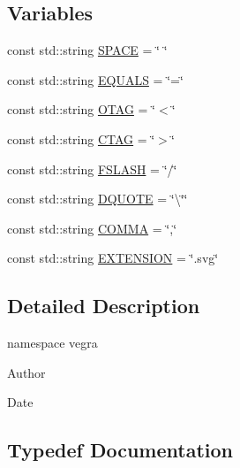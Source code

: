 \subsection*{Variables}
\begin{DoxyCompactItemize}
\item 
const std\+::string \mbox{\hyperlink{namespacevegra_a490ca2f98836fa22a92f9e141cc7ab1e}{S\+P\+A\+CE}} = \char`\"{} \char`\"{}
\item 
const std\+::string \mbox{\hyperlink{namespacevegra_adc1a2a72f90b97032bad20408a31dfb5}{E\+Q\+U\+A\+LS}} = \char`\"{}=\char`\"{}
\item 
const std\+::string \mbox{\hyperlink{namespacevegra_a6497d9c2bf3f1c7851bb59fd5af18ec2}{O\+T\+AG}} = \char`\"{}$<$\char`\"{}
\item 
const std\+::string \mbox{\hyperlink{namespacevegra_a9acf42016e6b9b201f6894fc1816240d}{C\+T\+AG}} = \char`\"{}$>$\char`\"{}
\item 
const std\+::string \mbox{\hyperlink{namespacevegra_abecfb0297d777200fecd622c806fd4a2}{F\+S\+L\+A\+SH}} = \char`\"{}/\char`\"{}
\item 
const std\+::string \mbox{\hyperlink{namespacevegra_ab1b1502dc2e3ca49f55d674d8b669301}{D\+Q\+U\+O\+TE}} = \char`\"{}\textbackslash{}\char`\"{}\char`\"{}
\item 
const std\+::string \mbox{\hyperlink{namespacevegra_aa1c954f0d9675c3c30a64de7b8bafdc2}{C\+O\+M\+MA}} = \char`\"{},\char`\"{}
\item 
const std\+::string \mbox{\hyperlink{namespacevegra_a85bf5beb5ac2df54e14ee7cd075c17e7}{E\+X\+T\+E\+N\+S\+I\+ON}} = \char`\"{}.svg\char`\"{}
\end{DoxyCompactItemize}


\subsection{Detailed Description}
namespace vegra 

\begin{DoxyAuthor}{Author}

\end{DoxyAuthor}
\begin{DoxyDate}{Date}

\end{DoxyDate}


\subsection{Typedef Documentation}
\mbox{\label{namespacevegra_a2722f5eceb74f65746a02a57b71d125e}} 
